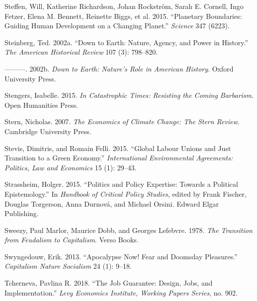 \documentclass[a4paper, nobind]{templates/ociamthesis}
\newlength{\cslhangindent}
\newenvironment{CSLReferences}[2] %
 {%
  \setlength{\parindent}{0pt}
  \ifodd #1
  \let\oldpar\par
  \def\par{\hangindent=\cslhangindent\oldpar}
  \fi
  \setlength{\parskip}{1mm}
  \setlength{\baselineskip}{6mm}
 }%
 {}
\begin{document}
\begin{CSLReferences}{1}{0}
\leavevmode{}%
Steffen, Will, Katherine Richardson, Johan Rockström, Sarah E. Cornell, Ingo Fetzer, Elena M. Bennett, Reinette Biggs, et al. 2015. {``Planetary Boundaries: {Guiding} Human Development on a Changing Planet.''} \emph{Science} 347 (6223).

\leavevmode{}%
Steinberg, Ted. 2002a. {``Down to Earth: {Nature}, Agency, and Power in History.''} \emph{The American Historical Review} 107 (3): 798--820.

\leavevmode{}%
---------. 2002b. \emph{Down to {Earth}: {Nature}'s {Role} in {American History}}. {Oxford University Press}.

\leavevmode{}%
Stengers, Isabelle. 2015. \emph{In {Catastrophic Times}: {Resisting} the {Coming Barbarism}}. {Open Humanities Press}.

\leavevmode{}%
Stern, Nicholas. 2007. \emph{The {Economics} of {Climate Change}: {The Stern Review}}. {Cambridge University Press}.

\leavevmode{}%
Stevis, Dimitris, and Romain Felli. 2015. {``Global Labour Unions and Just Transition to a Green Economy.''} \emph{International Environmental Agreements: Politics, Law and Economics} 15 (1): 29--43.

\leavevmode{}%
Strassheim, Holger. 2015. {``Politics and Policy Expertise: Towards a Political Epistemology.''} In \emph{Handbook of {Critical Policy Studies}}, edited by Frank Fischer, Douglas Torgerson, Anna Durnová, and Michael Orsini. {Edward Elgar Publishing}.

\leavevmode{}%
Sweezy, Paul Marlor, Maurice Dobb, and Georges Lefebvre. 1978. \emph{The {Transition} from {Feudalism} to {Capitalism}}. {Verso Books}.

\leavevmode{}%
Swyngedouw, Erik. 2013. {``Apocalypse {Now}! {Fear} and {Doomsday Pleasures}.''} \emph{Capitalism Nature Socialism} 24 (1): 9--18.

\leavevmode{}%
Tcherneva, Pavlina R. 2018. {``The Job Guarantee: {Design}, Jobs, and Implementation.''} \emph{Levy Economics Institute, Working Papers Series}, no. 902.


\end{CSLReferences}
\end{document}
